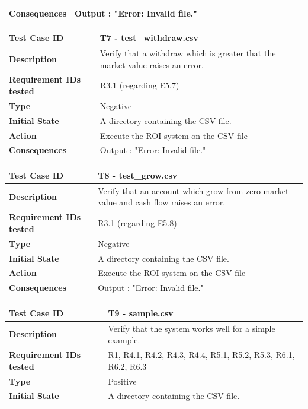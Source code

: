 \documentclass[runningheads,12pt]{article}
\begin{document}
{\begin{tabular}{|p{1.2in}|p{4in}|}
\hline 
\textbf{Consequences} & Output : "Error: Invalid file." \\ 
\hline
\end{tabular}
\bigskip
\centering
\begin{tabular}{|p{1.2in}|p{4in}|}
\hline
\textbf{Test Case ID} & T7 - test\_withdraw.csv \\ 
\hline
\textbf{Description} & Verify that a withdraw which is greater that the market value raises an error.\\
\hline
\textbf{Requirement IDs tested} & R3.1 (regarding E5.7) \\ 
\hline
\textbf{Type} & Negative \\ 
\hline
\textbf{Initial State} & A directory containing the CSV file.\\
\hline 
\textbf{Action} & Execute the ROI system on the CSV file \\
\hline 
\textbf{Consequences} & Output : "Error: Invalid file." \\ 
\hline
\end{tabular}
\bigskip
\centering
\begin{tabular}{|p{1.2in}|p{4in}|}
\hline
\textbf{Test Case ID} & T8 - test\_grow.csv \\ 
\hline
\textbf{Description} & Verify that an account which grow from zero market value and cash flow raises an error.\\
\hline
\textbf{Requirement IDs tested} & R3.1 (regarding E5.8) \\ 
\hline
\textbf{Type} & Negative \\ 
\hline
\textbf{Initial State} & A directory containing the CSV file.\\
\hline 
\textbf{Action} & Execute the ROI system on the CSV file \\
\hline 
\textbf{Consequences} & Output : "Error: Invalid file." \\ 
\hline
\end{tabular}
\bigskip
\centering
\begin{tabular}{|p{1.2in}|p{4in}|}
\hline
\textbf{Test Case ID} & T9 - sample.csv \\ 
\hline
\textbf{Description} & Verify that the system works well for a simple example.\\
\hline
\textbf{Requirement IDs tested} & R1, R4.1, R4.2, R4.3, R4.4, R5.1, R5.2, R5.3, R6.1, R6.2, R6.3 \\ 
\hline
\textbf{Type} & Positive \\ 
\hline
\textbf{Initial State} & A directory containing the CSV file.\\

\end{tabular}}
\end{document}
